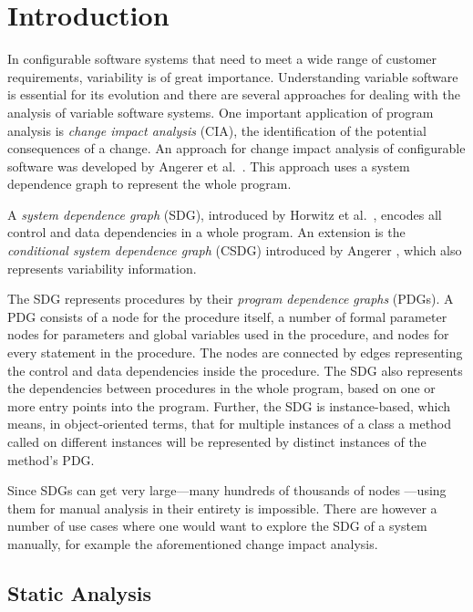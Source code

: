 \chapter{Introduction}

In configurable software systems that need to meet a wide range of customer requirements, variability is of great 
importance. Understanding variable software is essential for its evolution and there are several approaches for dealing 
with the analysis of variable software systems. One important application of program analysis is \emph{change impact 
analysis} (CIA), the identification of the potential consequences of a change. An approach for change impact analysis 
of configurable software was developed by Angerer et al.\ \cite{DBLP:conf/kbse/AngererGPG15}. This approach uses a 
system dependence graph to represent the whole program.

A \emph{system dependence graph} (SDG), introduced by Horwitz et al.\ \cite{DBLP:journals/toplas/HorwitzRB90}, encodes 
all control and data dependencies in a whole program. An extension is the \emph{conditional system dependence graph} 
(CSDG) introduced by Angerer \cite{DBLP:conf/splc/AngererPLGG14}, which also represents variability information.

The SDG represents procedures by their \emph{program dependence graphs} (PDGs). A PDG consists of a node for the 
procedure itself, a number of formal parameter nodes for parameters and global variables used in the procedure, and 
nodes for every statement in the procedure. The nodes are connected by edges representing the control and data 
dependencies inside the procedure. The SDG also represents the dependencies between procedures in the whole program, 
based on one or more entry points into the program. Further, the SDG is instance-based, which means, in object-oriented 
terms, that for multiple instances of a class a method called on different instances will be represented by 
distinct instances of the method's PDG.

Since SDGs can get very large---many hundreds of thousands of nodes 
\cite[sec.~4.3]{DBLP:conf/splc/AngererPLGG14}---using them for manual analysis in their entirety is impossible. There 
are however a number of use cases where one would want to explore the SDG of a system manually, for example the 
aforementioned change impact analysis.


\section{Static Analysis}


